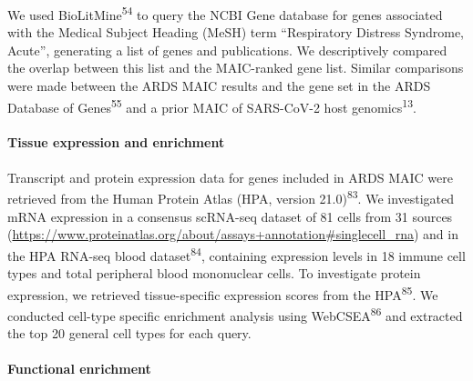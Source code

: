 \documentclass[
  11,
  a4paper,
]{article}
\let\oldparagraph\paragraph
\renewcommand{\paragraph}[1]{\oldparagraph{#1}\mbox{}}
\begin{document}
We used BioLitMine\textsuperscript{54} to query the NCBI Gene database
for genes associated with the Medical Subject Heading (MeSH) term
``Respiratory Distress Syndrome, Acute'', generating a list of genes and
publications. We descriptively compared the overlap between this list
and the MAIC-ranked gene list. Similar comparisons were made between the
ARDS MAIC results and the gene set in the ARDS Database of
Genes\textsuperscript{55} and a prior MAIC of SARS-CoV-2 host
genomics\textsuperscript{13}.

\hypertarget{tissue-expression-and-enrichment}{%
\paragraph{Tissue expression and
enrichment}\label{tissue-expression-and-enrichment}}

Transcript and protein expression data for genes included in ARDS MAIC
were retrieved from the Human Protein Atlas (HPA, version
21.0)\textsuperscript{83}. We investigated mRNA expression in a
consensus scRNA-seq dataset of 81 cells from 31 sources
(\url{https://www.proteinatlas.org/about/assays+annotation\#singlecell_rna})
and in the HPA RNA-seq blood dataset\textsuperscript{84}, containing
expression levels in 18 immune cell types and total peripheral blood
mononuclear cells. To investigate protein expression, we retrieved
tissue-specific expression scores from the HPA\textsuperscript{85}. We
conducted cell-type specific enrichment analysis using
WebCSEA\textsuperscript{86} and extracted the top 20 general cell types
for each query.

\hypertarget{functional-enrichment-1}{%
\paragraph{Functional enrichment}\label{functional-enrichment-1}}
\end{document}
